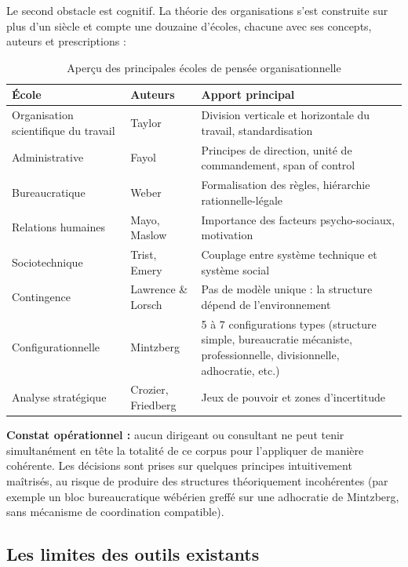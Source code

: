 \documentclass[11pt,a4paper]{article}
\begin{document}
Le second obstacle est cognitif. La théorie des organisations s'est construite sur plus d'un siècle et compte une douzaine d'écoles, chacune avec ses concepts, auteurs et prescriptions :

\begin{table}[h]
\centering
\small
\begin{tabular}{p{4cm} p{3cm} p{7cm}}
\toprule
\textbf{École} & \textbf{Auteurs} & \textbf{Apport principal} \\
\midrule
Organisation scientifique du travail & Taylor & Division verticale et horizontale du travail, standardisation \\
Administrative & Fayol & Principes de direction, unité de commandement, span of control \\
Bureaucratique & Weber & Formalisation des règles, hiérarchie rationnelle-légale \\
Relations humaines & Mayo, Maslow & Importance des facteurs psycho-sociaux, motivation \\
Sociotechnique & Trist, Emery & Couplage entre système technique et système social \\
Contingence & Lawrence \& Lorsch & Pas de modèle unique : la structure dépend de l'environnement \\
Configurationnelle & Mintzberg & 5 à 7 configurations types (structure simple, bureaucratie mécaniste, professionnelle, divisionnelle, adhocratie, etc.) \\
Analyse stratégique & Crozier, Friedberg & Jeux de pouvoir et zones d'incertitude \\
\bottomrule
\end{tabular}
\caption{Aperçu des principales écoles de pensée organisationnelle}
\end{table}

\begin{problembox}
\textbf{Constat opérationnel :} aucun dirigeant ou consultant ne peut tenir simultanément en tête la totalité de ce corpus pour l'appliquer de manière cohérente. Les décisions sont prises sur quelques principes intuitivement maîtrisés, au risque de produire des structures théoriquement incohérentes (par exemple un bloc bureaucratique wébérien greffé sur une adhocratie de Mintzberg, sans mécanisme de coordination compatible).
\end{problembox}

\subsection{Les limites des outils existants}
\end{document}
